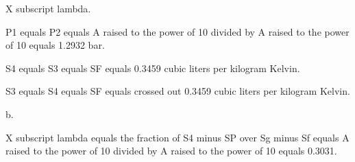 X subscript lambda.

P1 equals P2 equals A raised to the power of 10 divided by A raised to the power of 10 equals 1.2932 bar.

S4 equals S3 equals SF equals 0.3459 cubic liters per kilogram Kelvin.

S3 equals S4 equals SF equals crossed out 0.3459 cubic liters per kilogram Kelvin.

b.

X subscript lambda equals the fraction of S4 minus SP over Sg minus Sf equals A raised to the power of 10 divided by A raised to the power of 10 equals 0.3031.